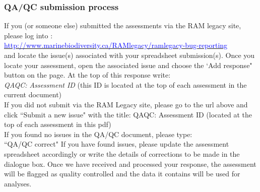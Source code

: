 \documentclass [a4paper, 10pt] {article}
\begin{document}
\subsubsection{QA/QC submission process}
If you (or someone else) submitted the assessments via the RAM legacy site, please log into :\\
\href{http://www.marinebiodiversity.ca/RAMlegacy/ramlegacy-bug-reporting}{\textcolor{blue}{http://www.marinebiodiversity.ca/RAMlegacy/ramlegacy-bug-reporting}}\\
and locate the issue(s) associated with your spreadsheet submission(s). Once you locate your assessment, open the associated issue and choose the `Add response" button on the page. At the top of this response write:\\
\textit{QAQC: Assessment ID} (this ID is located at the top of each assessment in the current document)\\
If you did not submit via the RAM Legacy site, please go to the url above and click ``Submit a new issue" with the title:
QAQC: Assessment ID (located at the top of each assessment in this pdf)\\
If you found no issues in the QA/QC document, please type:\\
``QA/QC correct"
If you have found issues, please update the assessment spreadsheet accordingly or write the details of corrections to be made in the dialogue box. Once we have received and processed your response, the assessment will be flagged as quality controlled and the data it contains will be used for analyses.
\pagebreak
\tableofcontents
\end{document}
